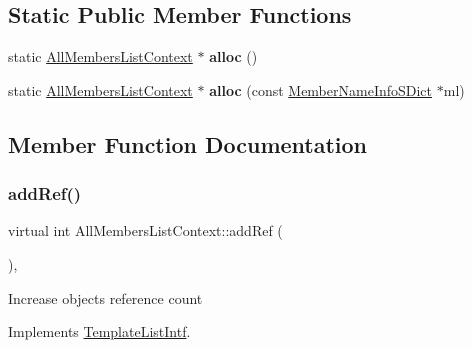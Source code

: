 \subsection*{Static Public Member Functions}
\begin{DoxyCompactItemize}
\item 
\mbox{\label{class_all_members_list_context_ac9291cad77d97be76759edc5846b5c7c}} 
static \mbox{\hyperlink{class_all_members_list_context}{All\+Members\+List\+Context}} $\ast$ {\bfseries alloc} ()
\item 
\mbox{\label{class_all_members_list_context_aed475e3a3dcfe53e5e30d3df5c5e435f}} 
static \mbox{\hyperlink{class_all_members_list_context}{All\+Members\+List\+Context}} $\ast$ {\bfseries alloc} (const \mbox{\hyperlink{class_member_name_info_s_dict}{Member\+Name\+Info\+S\+Dict}} $\ast$ml)
\end{DoxyCompactItemize}


\subsection{Member Function Documentation}
\mbox{\label{class_all_members_list_context_ac1944fc9ad154caa5ed58e28f49c2461}} 
\subsubsection{\texorpdfstring{addRef()}{addRef()}}
{\footnotesize\ttfamily virtual int All\+Members\+List\+Context\+::add\+Ref (\begin{DoxyParamCaption}{ }\end{DoxyParamCaption})\hspace{0.3cm}{\ttfamily [inline]}, {\ttfamily [virtual]}}

Increase object\textquotesingle{}s reference count 

Implements \mbox{\hyperlink{class_template_list_intf_a4b4973e2e15396d10bc4e3085462ca2b}{Template\+List\+Intf}}.

\mbox{\label{class_all_members_list_context_a0dc11cc3fddb12437e37fd350e94bd72}} 
